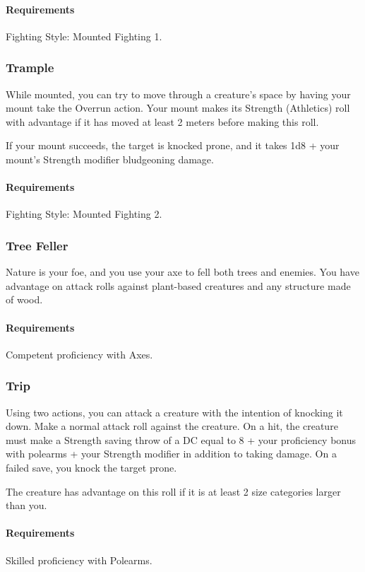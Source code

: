     \paragraph{Requirements} Fighting Style: Mounted Fighting 1.
\subsubsection{Trample} \label{feat::trample}
    While mounted, you can try to move through a creature's space by having your mount take the Overrun action.
    Your mount makes its Strength (Athletics) roll with advantage if it has moved at least 2 meters before making this roll.

    If your mount succeeds, the target is knocked prone, and it takes 1d8 + your mount's Strength modifier bludgeoning damage.
    \paragraph{Requirements} Fighting Style: Mounted Fighting 2.
\subsubsection{Tree Feller} \label{feat::treefeller}
    Nature is your foe, and you use your axe to fell both trees and enemies.
    You have advantage on attack rolls against plant-based creatures and any structure made of wood.
    \paragraph{Requirements} Competent proficiency with Axes.
\subsubsection{Trip} \label{feat::trip}
    Using two actions, you can attack a creature with the intention of knocking it down.
    Make a normal attack roll against the creature.
    On a hit, the creature must make a Strength saving throw of a DC equal to 8 + your proficiency bonus with polearms + your Strength modifier in addition to taking damage.
    On a failed save, you knock the target prone.

    The creature has advantage on this roll if it is at least 2 size categories larger than you.
    \paragraph{Requirements} Skilled proficiency with Polearms.

